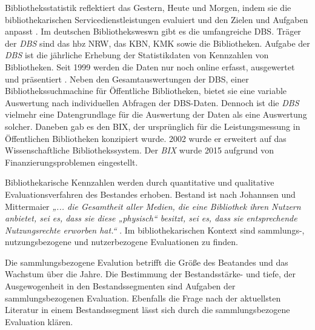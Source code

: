 Bibliotheksstatistik reflektiert das Gestern, Heute und Morgen, indem 
sie die bibliothekarischen Servicedienstleistungen evaluiert und den Zielen und Aufgaben anpasst \cite[vgl.][2 f.]{jilovsky_cathie_library_2004}.
Im deutschen Bibliotheksweswn gibt es die umfangreiche \acrfull{DBS}. 
Träger der \textit{\acrshort{DBS}} sind das \acrfull{hbz NRW},  das \acrfull{KBN}, \acrfull{KMK} sowie die Bibliotheken.
Aufgabe der \textit{\acrshort{DBS}} ist die jährliche Erhebung der Statistikdaten von Kennzahlen von Bibliotheken. 
Seit 1999 werden die Daten nur noch online erfasst, ausgewertet und präsentiert \cite[vgl.][2]{schmidt_deutsche_2008}.
Neben den Gesamtauswertungen der DBS, einer Bibliothekssuchmachine für Öffentliche Bibliotheken, 
bietet sie eine variable Auswertung nach individuellen Abfragen der DBS-Daten. 
Dennoch ist die \textit{\acrshort{DBS}} vielmehr eine Datengrundlage für die Auswertung der Daten als eine Auswertung solcher.
Daneben gab es den \acrfull{BIX}, der ursprünglich für die Leistungsmessung in Öffentlichen Bibliotheken konzipiert wurde. 
2002 wurde er erweitert auf das Wissenschaftliche Bibliothekssystem. Der \textit{\acrshort{BIX}} wurde 2015 aufgrund von Finanzierungsproblemen eingestellt. 

Bibliothekarische Kennzahlen werden durch quantitative und qualitative Evaluationsverfahren des Bestandes erhoben.
Bestand ist nach Johannsen und Mittermaier \textit{„... die Gesamtheit aller Medien, die eine Bibliothek ihren Nutzern anbietet, sei es, dass sie diese 
„physisch“ besitzt, sei es, dass sie entsprechende Nutzungsrechte erworben hat.“} \cite[252]{johannsen_jochen_bestands-_2015}.
Im bibliothekarischen Kontext sind sammlungs-, nutzungsbezogene und nutzerbezogene Evaluationen zu finden.\cite[vgl.][302]{johnson_peggy_fundamentals_2014}

Die sammlungsbezogene Evalution betrifft die Größe des Beatandes und das Wachstum über die Jahre. Die Bestimmung der Bestandsstärke- und tiefe, 
der Ausgewogenheit in den Bestandssegmenten sind Aufgaben der sammlungsbezogenen Evaluation. Ebenfalls die Frage nach der aktuellsten Literatur in einem Bestandssegment lässt sich durch die sammlungsbezogene Evaluation klären.

